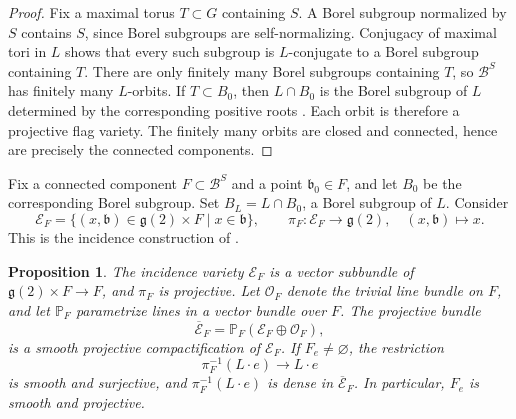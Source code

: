 \documentclass[12pt]{article}
\theoremstyle{paperplain}
\newtheorem{proposition}[theorem]{Proposition}
\newcommand{\g}{\mathfrak g}
\newcommand{\B}{\mathcal B}
\begin{document}
\begin{proof}
    Fix a maximal torus $T\subset G$ containing $S$. A Borel subgroup normalized by $S$ contains $S$, since Borel subgroups are self-normalizing. Conjugacy of maximal tori in $L$ shows that every such subgroup is $L$-conjugate to a Borel subgroup containing $T$. There are only finitely many Borel subgroups containing $T$, so $\B^S$ has finitely many $L$-orbits. If $T\subset B_0$, then $L\cap B_0$ is the Borel subgroup of $L$ determined by the corresponding positive roots \cite{Humphreys}. Each orbit is therefore a projective flag variety. The finitely many orbits are closed and connected, hence are precisely the connected components.
\end{proof}

Fix a connected component $F\subset\B^S$ and a point $\mathfrak b_0\in F$, and let $B_0$ be the corresponding Borel subgroup. Set $B_L=L\cap B_0$, a Borel subgroup of $L$. Consider
\[
    \mathcal E_F
        =\{(x,\mathfrak b)\in\g(2)\times F\mid x\in\mathfrak b\},
    \qquad
    \pi_F\colon\mathcal E_F\longrightarrow\g(2),
    \quad (x,\mathfrak b)\longmapsto x.
\]
This is the incidence construction of \cite[Sections~2.1--2.4 and~3.7]{DLP}.

\begin{proposition}\label{bundle}\label{smooth-family}
    The incidence variety $\mathcal E_F$ is a vector subbundle of $\g(2)\times F\to F$, and $\pi_F$ is projective. Let $\mathcal O_F$ denote the trivial line bundle on $F$, and let $\mathbb P_F$ parametrize lines in a vector bundle over $F$. The projective bundle
    \[
        \overline{\mathcal E}_F
            =\mathbb P_F(\mathcal E_F\oplus\mathcal O_F),
    \]
    is a smooth projective compactification of $\mathcal E_F$. If $F_e\ne\varnothing$, the restriction
    \[
        \pi_F^{-1}(L\cdot e)\longrightarrow L\cdot e
    \]
    is smooth and surjective, and $\pi_F^{-1}(L\cdot e)$ is dense in $\overline{\mathcal E}_F$. In particular, $F_e$ is smooth and projective.
\end{proposition}
\end{document}
